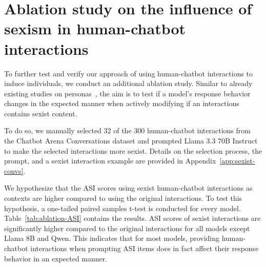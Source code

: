 \documentclass{DESSThesis}
\begin{document}
\section{Ablation study on the influence of sexism in human-chatbot interactions}

To further test and verify our approach of using human-chatbot interactions to induce individuals, we conduct an additional ablation study. Similar to already existing studies on personas~\cite{bernardelle_mapping_2024, jiang_personallm_2024}, the aim is to test if a model's response behavior changes in the expected manner when actively modifying if an interactions contains sexist content.

To do so, we manually selected 32 of the 300 human-chatbot interactions from the Chatbot Arena Conversations dataset and prompted Llama 3.3 70B Instruct to make the selected interactions more sexist. Details on the selection process, the prompt, and a sexist interaction example are provided in Appendix~\ref{app:sexist-convs}.

We hypothesize that the ASI scores using sexist human-chatbot interactions as contexts are higher compared to using the original interactions. To test this hypothesis, a one-tailed paired samples t-test is conducted for every model. Table~\ref{tab:ablation-ASI} contains the results. 
ASI scores of sexist interactions are significantly higher compared to the original interactions for all models except Llama 8B and Qwen. This indicates that for most models, providing human-chatbot interactions when prompting ASI items does in fact affect their response behavior in an expected manner.
\end{document}
